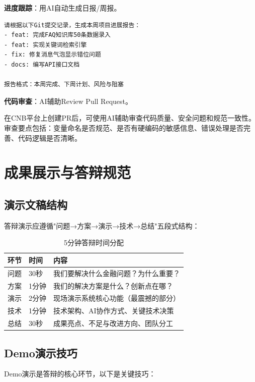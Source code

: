 \textbf{进度跟踪}：用AI自动生成日报/周报。

\begin{lstlisting}
请根据以下Git提交记录，生成本周项目进展报告：
- feat: 完成FAQ知识库50条数据录入
- feat: 实现关键词检索引擎
- fix: 修复消息气泡显示错位问题
- docs: 编写API接口文档

报告格式：本周完成、下周计划、风险与阻塞
\end{lstlisting}

\textbf{代码审查}：AI辅助Review Pull Request。

在CNB平台上创建PR后，可使用AI辅助审查代码质量、安全问题和规范一致性。审查要点包括：变量命名是否规范、是否有硬编码的敏感信息、错误处理是否完善、代码逻辑是否清晰。

\section{成果展示与答辩规范}

\subsection{演示文稿结构}

答辩演示应遵循"问题→方案→演示→技术→总结"五段式结构：

\begin{table}[H]
\centering
\begin{tabular}{clp{6cm}}
\toprule
\textbf{环节} & \textbf{时间} & \textbf{内容} \\
\midrule
问题 & 30秒 & 我们要解决什么金融问题？为什么重要？ \\
方案 & 1分钟 & 我们的解决方案是什么？创新点在哪？ \\
演示 & 2分钟 & 现场演示系统核心功能（最震撼的部分） \\
技术 & 1分钟 & 技术架构、AI协作方式、关键技术决策 \\
总结 & 30秒 & 成果亮点、不足与改进方向、团队分工 \\
\bottomrule
\end{tabular}
\caption{5分钟答辩时间分配}
\end{table}

\subsection{Demo演示技巧}

Demo演示是答辩的核心环节，以下是关键技巧：

